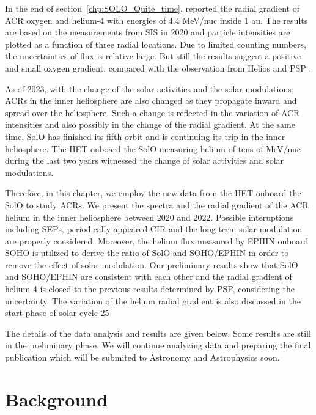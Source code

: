 In the end of section~\ref{chp:SOLO_Quite_time}, \citet{Mason-2021-SolOQuietTime} reported the radial gradient of \ac{ACR} oxygen and helium-4 with energies of 4.4 MeV/nuc inside 1 au. The results are based on the measurements from \ac{SIS} in 2020 and particle intensities are plotted as a function of three radial locations. Due to limited counting numbers, the uncertainties of flux is relative large. But still the results suggest a positive and small oxygen gradient, compared with the observation from Helios and \ac{PSP} \citep{Rankin2021ApJ,Marquardt2018AA}.

As of 2023, with the change of the solar activities and the solar modulations, \acp{ACR} in the inner heliosphere are also changed as they propagate inward and spread over the heliosphere. Such a change is reflected in the variation of \ac{ACR} intensities and also possibly in the change of the radial gradient.
At the same time, \ac{SolO} has finished its fifth orbit and is continuing its trip in the inner heliosphere. The \ac{HET} onboard the \ac{SolO} measuring helium of tens of MeV/nuc during the last two years witnessed the change of solar activities and solar modulations.

Therefore, in this chapter, we employ the new data from the \ac{HET} onboard the \ac{SolO} to study \acp{ACR}. We present the spectra and the radial gradient of the \ac{ACR} helium in the inner heliosphere between 2020 and 2022. Possible interuptions including \acp{SEP}, periodically appeared \ac{CIR} and the long-term solar modulation are properly considered. Moreover, the helium flux measured by \ac{EPHIN} onboard \ac{SOHO} is utilized to derive the ratio of \ac{SolO} and \ac{SOHO}/\ac{EPHIN} in order to remove the effect of solar modulation. Our preliminary results show that \ac{SolO} and \ac{SOHO}/\ac{EPHIN} are consistent with each other and the radial gradient of helium-4 is closed to the previous results determined by \ac{PSP}, considering the uncertainty. The variation of the helium radial gradient is also discussed in the start phase of solar cycle 25

The details of the data analysis and results are given below. Some results are still in the preliminary phase. We will continue analyzing data and preparing the final publication which will be submited to Astronomy and Astrophysics soon.


\section{Background}

